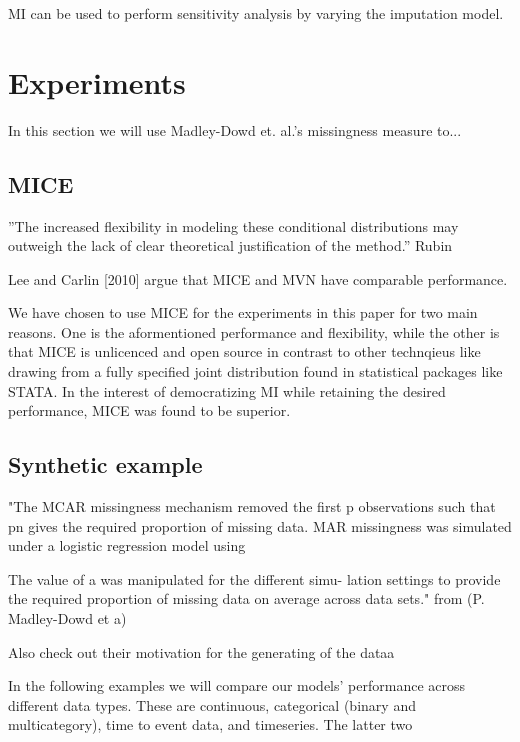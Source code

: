 \documentclass{article}
\begin{document}
	MI can be used to perform sensitivity analysis by varying the imputation model.
	
	
	\section{Experiments}
	In this section we will use Madley-Dowd et. al.'s missingness measure to...
	
	\subsection{MICE}
	''The
	increased flexibility in modeling these conditional distributions may outweigh
	the lack of clear theoretical justification of the method.'' Rubin
	
	Lee and Carlin  [2010] argue that MICE and MVN have comparable performance.
	
	We have chosen to use MICE for the experiments in this paper for two main reasons. One is the aformentioned performance and flexibility, while the other is that MICE is unlicenced and open source in contrast to other technqieus like drawing from a fully specified joint distribution found in statistical packages like STATA. In the interest of democratizing MI while retaining the desired performance, MICE was found to be superior.
	
	\subsection{Synthetic example}
	
	
	"The MCAR missingness mechanism
	removed the first p observations such that pn gives the
	required proportion of missing data. MAR missingness
	was simulated under a logistic regression model using
	
	The value of a was manipulated for the different simu-
	lation settings to provide the required proportion of missing
	data on average across data sets." from (P. Madley-Dowd et a)
	
	Also check out their motivation for the generating of the dataa
	
	
	In the following examples we will compare our models' performance across different data types. These are continuous, categorical (binary and multicategory), time to event data, and timeseries. The latter two 
	
\end{document}
